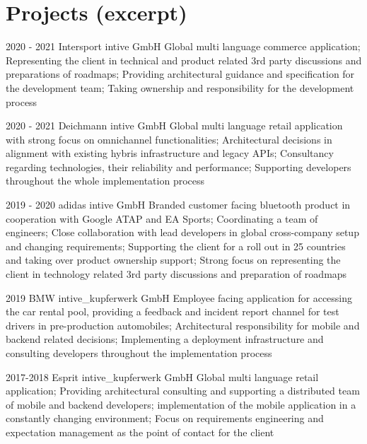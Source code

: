 \documentclass[]{friggeri-cv} %
\begin{document}
\section{Projects (excerpt)}

\begin{entrylist}
	
	\entry
	{2020 - 2021}
	{Intersport}
	{intive GmbH}
	{Global multi language commerce application; Representing the client in technical and product related 3rd party discussions and preparations of roadmaps; Providing architectural guidance and specification for the development team; Taking ownership and responsibility for the development process}
	
	
	\entry
	{2020 - 2021}
	{Deichmann}
	{intive GmbH}
	{Global multi language retail application with strong focus on omnichannel functionalities; Architectural decisions in alignment with existing hybris infrastructure and legacy APIs; Consultancy regarding technologies, their reliability and performance; Supporting developers throughout the whole implementation process}

	
	\entry
	{2019 - 2020}
	{adidas}
	{intive GmbH}
	{Branded customer facing bluetooth product in cooperation with Google ATAP and EA Sports; Coordinating a team of engineers; Close collaboration with lead developers in global cross-company setup and changing requirements; Supporting the client for a roll out in 25 countries and taking over product ownership support; Strong focus on representing the client in technology related 3rd party discussions and preparation of roadmaps}
	
	
	
	\entry
	{2019}
	{BMW}
	{intive\_kupferwerk GmbH}
	{Employee facing application for accessing the car rental pool, providing a feedback and incident report channel for test drivers in pre-production automobiles; Architectural responsibility for mobile and backend related decisions; Implementing a deployment infrastructure and consulting developers throughout the implementation process}
	
	
	\entry
	{2017-2018}
	{Esprit}
	{intive\_kupferwerk GmbH}
	{Global multi language retail application; Providing architectural consulting and supporting a distributed team of mobile and backend developers; implementation of the mobile application in a constantly changing environment; Focus on requirements engineering and expectation management as the point of contact for the client}
	

\end{entrylist}
\end{document}
